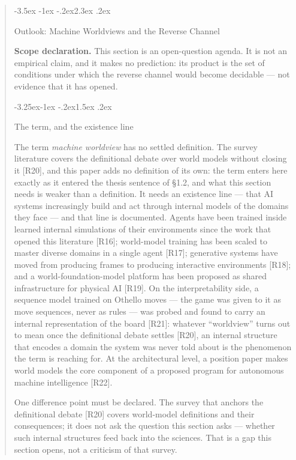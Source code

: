 \documentclass[11pt,a4paper]{article}
\makeatletter
\renewcommand\section{\@startsection{section}{1}{\z@}%
  {-3.5ex \@plus -1ex \@minus -.2ex}{2.3ex \@plus .2ex}%
  {\normalfont\Large\bfseries\raggedright}}
\renewcommand\subsection{\@startsection{subsection}{2}{\z@}%
  {-3.25ex\@plus -1ex \@minus -.2ex}{1.5ex \@plus .2ex}%
  {\normalfont\large\bfseries\raggedright}}
\makeatother
\begin{document}
\begin{abstract}
\section{Outlook: Machine Worldviews and the Reverse Channel}

\textbf{Scope declaration.} This section is an open-question agenda. It is not an empirical claim, and it makes no prediction: its product is the set of conditions under which the reverse channel would become decidable — not evidence that it has opened.

\subsection{The term, and the existence line}

The term \textit{machine worldview} has no settled definition. The survey literature covers the definitional debate over world models without closing it [R20], and this paper adds no definition of its own: the term enters here exactly as it entered the thesis sentence of §1.2, and what this section needs is weaker than a definition. It needs an existence line — that AI systems increasingly build and act through internal models of the domains they face — and that line is documented. Agents have been trained inside learned internal simulations of their environments since the work that opened this literature [R16]; world-model training has been scaled to master diverse domains in a single agent [R17]; generative systems have moved from producing frames to producing interactive environments [R18]; and a world-foundation-model platform has been proposed as shared infrastructure for physical AI [R19]. On the interpretability side, a sequence model trained on Othello moves — the game was given to it as move sequences, never as rules — was probed and found to carry an internal representation of the board [R21]: whatever ``worldview'' turns out to mean once the definitional debate settles [R20], an internal structure that encodes a domain the system was never told about is the phenomenon the term is reaching for. At the architectural level, a position paper makes world models the core component of a proposed program for autonomous machine intelligence [R22].

One difference point must be declared. The survey that anchors the definitional debate [R20] covers world-model definitions and their consequences; it does not ask the question this section asks — whether such internal structures feed back into the sciences. That is a gap this section opens, not a criticism of that survey.


\end{abstract}
\end{document}

